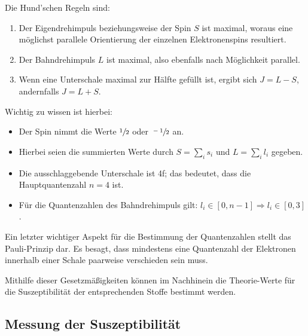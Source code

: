     Die Hund'schen Regeln sind:
    \begin{enumerate}
        \item Der Eigendrehimpuls beziehungsweise der Spin $S$ ist maximal, woraus eine möglichst parallele Orientierung 
            der einzelnen Elektronenspins resultiert.    
        \item Der Bahndrehimpuls $L$ ist maximal, also ebenfalls nach Möglichkeit parallel. 
        \item Wenn eine Unterschale maximal zur Hälfte gefüllt ist, ergibt sich ${J=L-S}$, andernfalls ${J=L+S}$.
    \end{enumerate}
    Wichtig zu wissen ist hierbei: 
    \begin{itemize}
        \item Der Spin nimmt die Werte $\sfrac{1}{2}$ oder $\sfrac{-1}{2}$ an. 
        \item Hierbei seien die summierten Werte durch $S=\sum_i s_i$ und $L=\sum_i l_i$ gegeben. 
        \item Die ausschlaggebende Unterschale ist 4f; das bedeutet, dass die Hauptquantenzahl ${n=4}$ ist.
        \item Für die Quantenzahlen des Bahndrehimpuls gilt: $l_i \in [0,n-1] \Rightarrow l_i \in [0,3]$ .
    \end{itemize}

    Ein letzter wichtiger Aspekt für die Bestimmung der Quantenzahlen stellt das Pauli-Prinzip dar. 
    Es besagt, dass mindestens eine Quantenzahl der Elektronen innerhalb einer Schale paarweise verschieden sein muss. 
    
    Mithilfe dieser Gesetzmäßigkeiten können im Nachhinein die Theorie-Werte für die Suszeptibilität der entsprechenden Stoffe bestimmt werden. 

\subsection{Messung der Suszeptibilität}

    